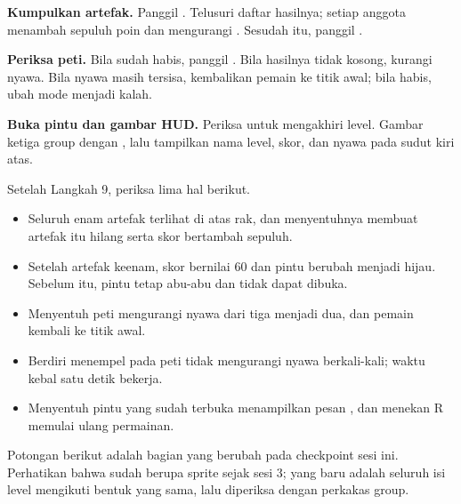 \begin{langkah}
  \item \textbf{Kumpulkan artefak.} Panggil
        . Telusuri daftar hasilnya;
        setiap anggota menambah sepuluh poin dan mengurangi
        . Sesudah itu, panggil
        .

  \item \textbf{Periksa peti.} Bila  sudah habis, panggil
        . Bila hasilnya tidak
        kosong, kurangi nyawa. Bila nyawa masih tersisa, kembalikan pemain ke
        titik awal; bila habis, ubah mode menjadi kalah.

  \item \textbf{Buka pintu dan gambar HUD.} Periksa
         untuk
        mengakhiri level. Gambar ketiga group dengan , lalu tampilkan
        nama level, skor, dan nyawa pada sudut kiri atas.
\end{langkah}

\begin{ujibox}
Setelah Langkah 9, periksa lima hal berikut.
\begin{itemize}[leftmargin=1.4em, itemsep=0.2em]
  \item Seluruh enam artefak terlihat di atas rak, dan menyentuhnya membuat
        artefak itu hilang serta skor bertambah sepuluh.
  \item Setelah artefak keenam, skor bernilai 60 dan pintu berubah menjadi
        hijau. Sebelum itu, pintu tetap abu-abu dan tidak dapat dibuka.
  \item Menyentuh peti mengurangi nyawa dari tiga menjadi dua, dan pemain
        kembali ke titik awal.
  \item Berdiri menempel pada peti tidak mengurangi nyawa berkali-kali; waktu
        kebal satu detik bekerja.
  \item Menyentuh pintu yang sudah terbuka menampilkan pesan
        , dan menekan R memulai ulang permainan.
\end{itemize}
\end{ujibox}


Potongan berikut adalah bagian yang berubah pada checkpoint sesi ini.
Perhatikan bahwa  sudah berupa sprite sejak sesi 3; yang baru
adalah seluruh isi level mengikuti bentuk yang sama, lalu diperiksa dengan
perkakas group.

